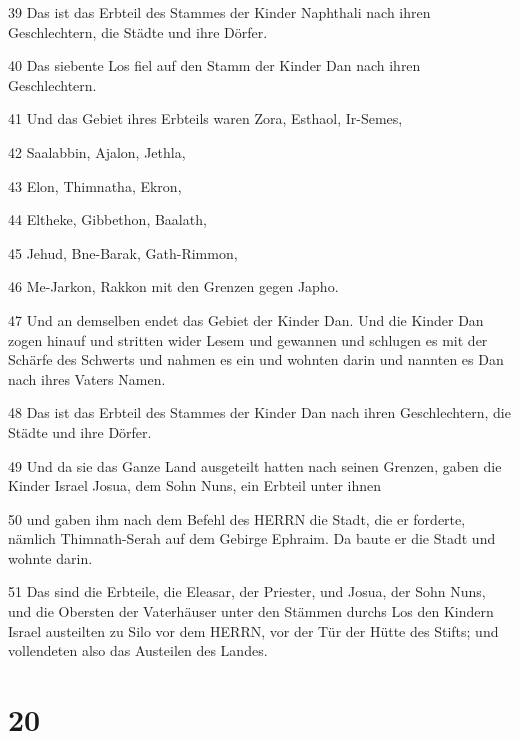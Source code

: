 \par 39 Das ist das Erbteil des Stammes der Kinder Naphthali nach ihren Geschlechtern, die Städte und ihre Dörfer.
\par 40 Das siebente Los fiel auf den Stamm der Kinder Dan nach ihren Geschlechtern.
\par 41 Und das Gebiet ihres Erbteils waren Zora, Esthaol, Ir-Semes,
\par 42 Saalabbin, Ajalon, Jethla,
\par 43 Elon, Thimnatha, Ekron,
\par 44 Eltheke, Gibbethon, Baalath,
\par 45 Jehud, Bne-Barak, Gath-Rimmon,
\par 46 Me-Jarkon, Rakkon mit den Grenzen gegen Japho.
\par 47 Und an demselben endet das Gebiet der Kinder Dan. Und die Kinder Dan zogen hinauf und stritten wider Lesem und gewannen und schlugen es mit der Schärfe des Schwerts und nahmen es ein und wohnten darin und nannten es Dan nach ihres Vaters Namen.
\par 48 Das ist das Erbteil des Stammes der Kinder Dan nach ihren Geschlechtern, die Städte und ihre Dörfer.
\par 49 Und da sie das Ganze Land ausgeteilt hatten nach seinen Grenzen, gaben die Kinder Israel Josua, dem Sohn Nuns, ein Erbteil unter ihnen
\par 50 und gaben ihm nach dem Befehl des HERRN die Stadt, die er forderte, nämlich Thimnath-Serah auf dem Gebirge Ephraim. Da baute er die Stadt und wohnte darin.
\par 51 Das sind die Erbteile, die Eleasar, der Priester, und Josua, der Sohn Nuns, und die Obersten der Vaterhäuser unter den Stämmen durchs Los den Kindern Israel austeilten zu Silo vor dem HERRN, vor der Tür der Hütte des Stifts; und vollendeten also das Austeilen des Landes.

\chapter{20}

